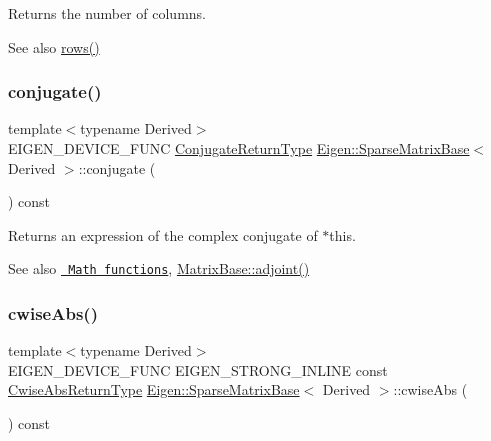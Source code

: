 \begin{DoxyReturn}{Returns}
the number of columns. 
\end{DoxyReturn}
\begin{DoxySeeAlso}{See also}
\mbox{\hyperlink{class_eigen_1_1_sparse_matrix_base_a1944e9fa9ce7937bfc3a87b2cb94371f}{rows()}} 
\end{DoxySeeAlso}
\mbox{\label{class_eigen_1_1_sparse_matrix_base_a22b6b4e39a3d31125a3f8f53b1083224}} 
\subsubsection{\texorpdfstring{conjugate()}{conjugate()}}
{\footnotesize\ttfamily template$<$typename Derived$>$ \\
E\+I\+G\+E\+N\+\_\+\+D\+E\+V\+I\+C\+E\+\_\+\+F\+U\+NC \mbox{\hyperlink{struct_eigen_1_1internal_1_1true__type}{Conjugate\+Return\+Type}} \mbox{\hyperlink{class_eigen_1_1_sparse_matrix_base}{Eigen\+::\+Sparse\+Matrix\+Base}}$<$ Derived $>$\+::conjugate (\begin{DoxyParamCaption}{ }\end{DoxyParamCaption}) const\hspace{0.3cm}{\ttfamily [inline]}}

\begin{DoxyReturn}{Returns}
an expression of the complex conjugate of {\ttfamily $\ast$this}.
\end{DoxyReturn}
\begin{DoxySeeAlso}{See also}
\href{group__CoeffwiseMathFunctions.html\#cwisetable_conj}{\texttt{ Math functions}}, \mbox{\hyperlink{class_eigen_1_1_matrix_base_afacca1f88da57e5cd87dd07c8ff926bb}{Matrix\+Base\+::adjoint()}} 
\end{DoxySeeAlso}
\mbox{\label{class_eigen_1_1_sparse_matrix_base_ae8e39ef24c78084bdaddddad8488e11b}} 
\subsubsection{\texorpdfstring{cwiseAbs()}{cwiseAbs()}}
{\footnotesize\ttfamily template$<$typename Derived$>$ \\
E\+I\+G\+E\+N\+\_\+\+D\+E\+V\+I\+C\+E\+\_\+\+F\+U\+NC E\+I\+G\+E\+N\+\_\+\+S\+T\+R\+O\+N\+G\+\_\+\+I\+N\+L\+I\+NE const \mbox{\hyperlink{class_eigen_1_1_cwise_unary_op}{Cwise\+Abs\+Return\+Type}} \mbox{\hyperlink{class_eigen_1_1_sparse_matrix_base}{Eigen\+::\+Sparse\+Matrix\+Base}}$<$ Derived $>$\+::cwise\+Abs (\begin{DoxyParamCaption}{ }\end{DoxyParamCaption}) const\hspace{0.3cm}{\ttfamily [inline]}}


